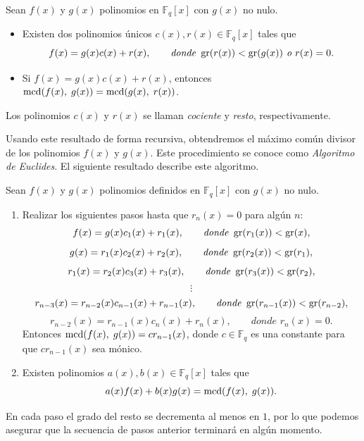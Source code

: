 \begin{theorem}
    \label{th:div_alg}
    Sean $f(x)$ y $g(x)$ polinomios en $\mathbb{F}_q[x]$ con $g(x)$ no nulo.
    \begin{itemize}
        \item Existen dos polinomios únicos $c(x), r(x) \in \mathbb{F}_q[x]$ tales que
        $$f(x) = g(x) c(x) + r(x), \qquad \textit{donde } \operatorname{gr}(r(x)) < \operatorname{gr}(g(x)) \textit{ o } r(x) = 0.$$
        \item Si $f(x) = g(x) c(x) + r(x)$, entonces $\operatorname{mcd}(f(x), \; g(x)) = \operatorname{mcd}(g(x), \; r(x))$.
    \end{itemize}
\end{theorem}

Los polinomios $c(x)$ y $r(x)$ se llaman \emph{cociente} y \emph{resto}, respectivamente.

Usando este resultado de forma recursiva, obtendremos el máximo común divisor de los polinomios $f(x)$ y $g(x)$. Este procedimiento se conoce como \emph{Algoritmo de Euclides}. El siguiente resultado describe este algoritmo.

\begin{theorem}
    Sean $f(x)$ y $g(x)$ polinomios definidos en $\mathbb{F}_q[x]$ con $g(x)$ no nulo.
    \begin{enumerate}
        \item Realizar los siguientes pasos hasta que $r_n(x) = 0$ para algún $n$:
        $$f(x) = g(x) c_1(x) + r_1(x), \qquad \textit{donde } \operatorname{gr}(r_1(x)) < \operatorname{gr}(x),$$
        $$g(x) = r_1(x) c_2(x) + r_2(x), \qquad \textit{donde } \operatorname{gr}(r_2(x)) < \operatorname{gr}(r_1),$$
        $$r_1(x) = r_2(x) c_3(x) + r_3(x), \qquad \textit{donde } \operatorname{gr}(r_3(x)) < \operatorname{gr}(r_2),$$
        $$\vdots$$
        $$r_{n-3}(x) = r_{n-2}(x) c_{n-1}(x) + r_{n-1}(x), \qquad \textit{donde } \operatorname{gr}(r_{n-1}(x)) < \operatorname{gr}(r_{n-2}),$$
        $$r_{n-2}(x) = r_{n-1}(x) c_{n}(x) + r_{n}(x), \qquad \textit{donde } r_n(x) = 0.$$
        Entonces $\operatorname{mcd}(f(x), \; g(x)) = cr_{n-1}(x)$, donde $c \in \mathbb{F}_q$ es una constante para que $c r_{n-1}(x)$ sea mónico.
        \item Existen polinomios $a(x), b(x) \in \mathbb{F}_q[x]$ tales que 
        $$a(x) f(x) + b(x) g(x) = \operatorname{mcd}(f(x), \; g(x)).$$
    \end{enumerate}
\end{theorem}

En cada paso el grado del resto se decrementa al menos en $1$, por lo que podemos asegurar que la secuencia de pasos anterior terminará en algún momento.

